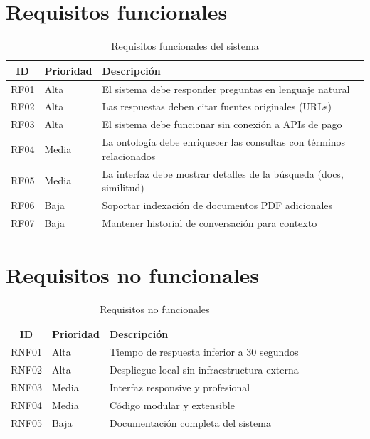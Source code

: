 \documentclass[12pt, a4paper, twoside]{report}
\begin{document}
\section{Requisitos funcionales}

\begin{table}[H]
\centering
\caption{Requisitos funcionales del sistema}
\label{tab:req-funcionales}
\begin{tabularx}{\textwidth}{clX}
\toprule
\textbf{ID} & \textbf{Prioridad} & \textbf{Descripci\'on} \\
\midrule
RF01 & Alta & El sistema debe responder preguntas en lenguaje natural \\
RF02 & Alta & Las respuestas deben citar fuentes originales (URLs) \\
RF03 & Alta & El sistema debe funcionar sin conexi\'on a APIs de pago \\
RF04 & Media & La ontolog\'ia debe enriquecer las consultas con t\'erminos relacionados \\
RF05 & Media & La interfaz debe mostrar detalles de la b\'usqueda (docs, similitud) \\
RF06 & Baja & Soportar indexaci\'on de documentos PDF adicionales \\
RF07 & Baja & Mantener historial de conversaci\'on para contexto \\
\bottomrule
\end{tabularx}
\end{table}

\section{Requisitos no funcionales}

\begin{table}[H]
\centering
\caption{Requisitos no funcionales}
\label{tab:req-no-funcionales}
\begin{tabularx}{\textwidth}{clX}
\toprule
\textbf{ID} & \textbf{Prioridad} & \textbf{Descripci\'on} \\
\midrule
RNF01 & Alta & Tiempo de respuesta inferior a 30 segundos \\
RNF02 & Alta & Despliegue local sin infraestructura externa \\
RNF03 & Media & Interfaz responsive y profesional \\
RNF04 & Media & C\'odigo modular y extensible \\
RNF05 & Baja & Documentaci\'on completa del sistema \\
\bottomrule
\end{tabularx}
\end{table}
\end{document}
